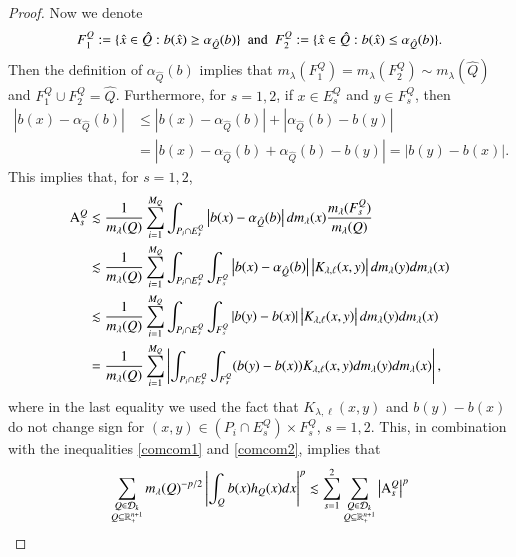 \documentclass[12pt]{amsart}
\begin{document}
\begin{proof}
Now we denote
\begin{align*}
F_{1}^{Q}:=\{{\hat x}\in \hat{Q}:b({\hat x})\geq\alpha_{\hat{Q}}(b)\}\ \ {\rm and}\ \
F_{2}^{Q}:=\{{\hat x}\in \hat{Q}:b({\hat x})\leq\alpha_{\hat{Q}}(b)\}.
\end{align*}
Then the definition of $\alpha_{\hat{Q}}(b)$ implies that $m_\lambda(F_{1}^{Q})=m_\lambda(F_{2}^{Q})\sim m_\lambda(\hat{Q})$ and $F_{1}^{Q}\cup F_{2}^{Q}=\hat{Q}$. Furthermore, for $s=1,2$, if $x\in E_{s}^{Q}$ and $y\in F_{s}^{Q}$, then
\begin{align*}
\left|b(x)-\alpha_{\hat{Q}}(b)\right|&\leq\left|b(x)-\alpha_{\hat{Q}}(b)\right|+\left|\alpha_{\hat{Q}}(b)-b(y)\right|\\
&=\left|b(x)-\alpha_{\hat{Q}}(b)+\alpha_{\hat{Q}}(b)-b(y)\right|= \left|b(y)-b(x)\right|.
\end{align*}
This implies that, for $ s=1,2$,
\begin{align}\label{haha}
{\rm A}_{s}^{Q}&\lesssim \frac{1}{m_\lambda(Q)}\sum_{i=1}^{M_Q}\int_{P_{i}\cap E_{s}^{Q}}\left|b(x)-\alpha_{\hat{Q}}(b)\right|dm_\lambda(x)\frac{m_\lambda(F_{s}^{Q})}{m_\lambda(Q)}\nonumber\\
&\lesssim \frac{1}{m_\lambda(Q)}\sum_{i=1}^{M_Q}\int_{P_{i}\cap E_{s}^{Q}}\int_{F_{s}^{Q}}\left|b(x)-\alpha_{\hat{Q}}(b)\right|\left|K_{\lambda,\ell}(x,y)\right|dm_\lambda(y)dm_\lambda(x)\nonumber\\
&\lesssim \frac{1}{m_\lambda(Q)}\sum_{i=1}^{M_Q}\int_{P_{i}\cap E_{s}^{Q}}\int_{F_{s}^{Q}}\left|b(y)-b(x)\right|\left|K_{\lambda,\ell}(x,y)\right|dm_\lambda(y)dm_\lambda(x)\nonumber\\
&=\frac{1}{m_\lambda(Q)}\sum_{i=1}^{M_Q}\left|\int_{P_{i}\cap E_{s}^{Q}}\int_{F_{s}^{Q}}(b(y)-b(x))K_{\lambda,\ell}(x,y)dm_\lambda(y)dm_\lambda(x)\right|,
\end{align}
where in the last equality we used the fact that $K_{\lambda,\ell}(x,y)$ and $b(y)-b(x)$ do not  change sign for $(x,y)\in (P_{i}\cap E_{s}^{Q})\times F_{s}^{Q}$, $s=1,2$. This, in combination with the inequalities \eqref{comcom1} and \eqref{comcom2}, implies that
\begin{align}\label{eee ortho S norm}
\sum_{\substack{Q\in\mathcal{D}_{k}\\Q\subseteq \mathbb{R}_+^{n+1}}}m_\lambda(Q)^{-p/2}\left|\int_{Q}b(x)h_{Q}(x)dx\right|^{p}
& \lesssim  \sum_{s=1}^{2}\sum_{\substack{Q\in \mathcal{D}_{k}\\Q\subseteq \mathbb{R}_+^{n+1}}}\left|{\rm A}_{s}^{Q}\right|^{p}
\nonumber\\

\end{align}
\end{proof}
\end{document}
